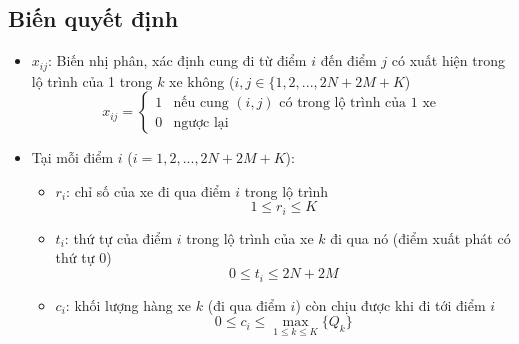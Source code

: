 \documentclass[3p,12pt]{article}
\begin{document}
	\subsection{Biến quyết định}
		\begin{itemize}
			\item $x_{ij}$: Biến nhị phân, xác định cung đi từ điểm $i$ đến điểm $j$ có xuất hiện trong lộ trình của 1 trong $k$ xe không ($i,j\in \{1,2,...,2N+2M+K$)
			\begin{equation}
				x_{ij} = 
				\begin{cases}
				1 & \text{nếu cung $(i,j)$ có trong lộ trình của 1 xe}\\
				0 & \text{ngược lại}
				\end{cases}
			\end{equation}
			\item Tại mỗi điểm $i$ ($i=1,2,...,2N+2M+K$):
			\begin{itemize}
				\item $r_i$: chỉ số của xe đi qua điểm $i$ trong lộ trình
				\begin{equation}
					1\leq r_i\leq K
				\end{equation}
				\item $t_i$: thứ tự của điểm $i$ trong lộ trình của xe $k$ đi qua nó (điểm xuất phát có thứ tự 0)
				\begin{equation}
					0\leq t_i\leq 2N+2M
				\end{equation}
				\item $c_i$: khối lượng hàng xe $k$ (đi qua điểm $i$) còn chịu được khi đi tới điểm $i$
				\begin{equation}
					0\leq c_i\leq \max _{1\leq k\leq K} \{Q_k\}
				\end{equation}
			\end{itemize}
		\end{itemize}
	
\end{document}
